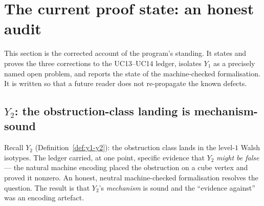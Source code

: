 \section{The current proof state: an honest audit}
\label{sec:proof-state}

This section is the corrected account of the program's standing. It
states and proves the three corrections to the UC13--UC14 ledger,
isolates $Y_1$ as a precisely named open problem, and reports the state
of the machine-checked formalisation. It is written so that a future
reader does not re-propagate the known defects.

\subsection{$Y_2$: the obstruction-class landing is mechanism-sound}
\label{ssec:y2}

Recall $Y_2$ (Definition~\ref{def:y1-y2}): the obstruction class lands
in the level-$1$ Walsh isotypes. The ledger carried, at one point,
specific evidence that $Y_2$ \emph{might be false} --- the natural
machine encoding placed the obstruction on a cube vertex and proved it
nonzero. An honest, neutral machine-checked formalisation resolves the
question. The result is that $Y_2$'s \emph{mechanism} is sound and the
``evidence against'' was an encoding artefact.

